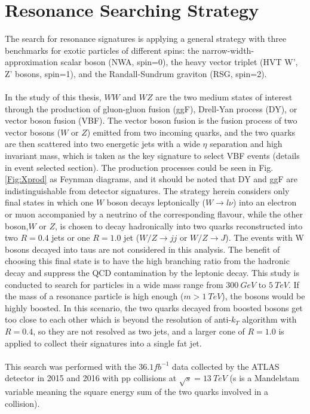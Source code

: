 \chapter{Resonance Searching Strategy}
The search for resonance signatures is applying a general strategy with three benchmarks for exotic particles of different spins: the narrow-width-approximation scalar boson (NWA, spin=0), the heavy vector triplet (HVT W', Z' bosons, spin=1), and the Randall-Sundrum graviton (RSG, spin=2).
\\
\\In the study of this thesis, $WW$ and $WZ$ are the two medium states of interest through the production of gluon-gluon fusion (ggF), Drell-Yan process (DY), or vector boson fusion (VBF). The vector boson fusion is the fusion process of two vector bosons ($W$ or $Z$) emitted from two incoming quarks, and the two quarks are then scattered into two energetic jets with a wide $\eta$ separation and high invariant mass, which is taken as the key signature to select VBF events (details in event selected section). The production processes could be seen in Fig. \ref{Fig:Xprod} as Feynman diagrams, and it should be noted that DY and ggF are indistinguishable from detector signatures. The strategy herein considers only final states in which one $W$ boson decays leptonically ($W\rightarrow l\nu$) into an electron or muon accompanied by a neutrino of the corresponding flavour, while the other boson,$W$ or $Z$, is chosen to decay hadronically into two quarks reconstructed into two $R=0.4$ jets or one $R=1.0$ jet ($W/Z\rightarrow jj$ or $W/Z\rightarrow J$). The events with W bosons decayed into taus are not considered in this analysis. The benefit of choosing this final state is to have the high branching ratio from the hadronic decay and suppress the QCD contamination by the leptonic decay. This study is conducted to search for particles in a wide mass range from $300~GeV$ to $5~TeV$. If the mass of a resonance particle is high enough ($m>1~TeV$), the bosons would be highly boosted. In this scenario, the two quarks decayed from boosted bosons get too close to each other which is beyond the resolution of anti-$k_{T}$ algorithm with $R=0.4$, so they are not resolved as two jets, and a larger cone of $R=1.0$ is applied to collect their signatures into a single fat jet. 
\\
\\This search was performed with the $36.1fb^{-1}$ data collected by the ATLAS detector in 2015 and 2016 with pp collisions at $\sqrt{s}=13~TeV$ (s is a Mandelstam variable meaning the square energy sum of the two quarks involved in a collision). 

